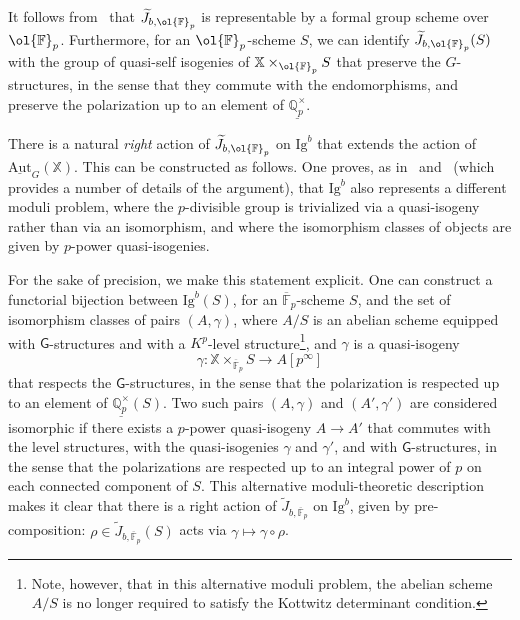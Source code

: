 \documentclass[letterpaper,11pt]{amsart}
\begin{document}
It follows from~\cite[Lemma 4.2.10]{CS17} that $\widetilde{J}_{b,\ol{\mathbb{F}}_p}$ is representable by a formal group scheme over $\ol{\mathbb{F}}_p$. Furthermore, for an $\ol{\mathbb{F}}_p$-scheme $S$, we can identify $\widetilde{J}_{b, \ol{\mathbb{F}}_p}(S)$ with the group of quasi-self isogenies of $\mathbb{X}\times_{\ol{\mathbb{F}}_p} S$ that preserve the $G$-structures, in the sense that they commute with the endomorphisms, and preserve the polarization up to an element of $\underline{\mathbb{Q}_p^\times}$. 

There is a natural \emph{right} action of $\widetilde{J}_{b, \ol{\mathbb{F}}_p}$ on $\mathrm{Ig}^b$ that extends the action of $\underline{\mathrm{Aut}}_G(\mathbb{X})$. This can be constructed as follows. One proves, as in~\cite[Lemma 4.3.4]{CS17} and~\cite[Lemma 4.2.2]{Caraiani-Tamiozzo} (which provides a number of details of the argument), that $\mathrm{Ig}^b$ also represents a different moduli problem, where the $p$-divisible group is trivialized via a quasi-isogeny rather than via an isomorphism, and where the isomorphism classes of objects are given by $p$-power quasi-isogenies. 

For the sake of precision, we make this statement explicit. One can construct a functorial bijection between $\mathrm{Ig}^b(S)$, for an $\overline{\mathbb{F}}_p$-scheme $S$, and the set of isomorphism classes of pairs $(A,\gamma)$, where $A/S$ is an abelian scheme equipped with $\mathsf{G}$-structures and with a $K^p$-level structure\footnote{Note, however, that in this alternative moduli problem, the abelian scheme $A/S$ is no longer required to satisfy the Kottwitz determinant condition.}, and $\gamma$ is a quasi-isogeny 
\[
\gamma: \mathbb{X}\times_{\overline{\mathbb{F}}_p} S \to A[p^\infty]
\]
that respects the $\mathsf{G}$-structures, in the sense that the polarization is respected up to an element of $\underline{\mathbb{Q}_p^\times}(S)$. Two such pairs $(A, \gamma)$ and $(A', \gamma')$ are considered isomorphic if there exists a $p$-power quasi-isogeny $A\to A'$ that commutes with the level structures, with the quasi-isogenies $\gamma$ and $\gamma'$, and with $\mathsf{G}$-structures, in the sense that the polarizations are respected up to an integral power of $p$ on each connected component of $S$. 
This alternative moduli-theoretic description makes it clear that there is a right action of $\widetilde{J}_{b,\overline{\mathbb{F}}_p}$ on $\mathrm{Ig}^b$, given by pre-composition: $\rho\in \widetilde{J}_{b, \overline{\mathbb{F}}_p}(S)$ acts via $\gamma \mapsto \gamma\circ \rho$.
\end{document}
